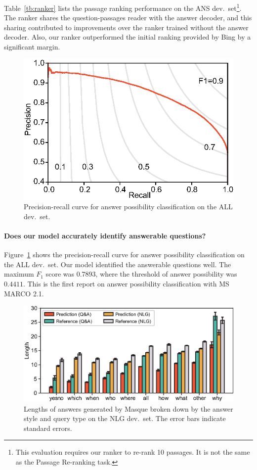 \documentclass[11pt,a4paper]{article}
\theoremstyle{mydef}
\theoremstyle{myprob}
\begin{document}
Table~\ref{tb:ranker} lists the passage ranking performance 
on the ANS dev.~set\footnote{This evaluation requires our ranker to re-rank 10 passages. It is not the same as the Passage Re-ranking task.}.
The ranker shares the 
question-passages 
reader with the answer decoder, and this sharing contributed to improvements over the ranker trained without the answer decoder. 
Also, our ranker outperformed the initial ranking provided by Bing by a significant margin. 


\begin{figure}[t!]
\centering
\includegraphics[width=.36\textwidth]{./images/masque_prcurve333.eps}
\caption{Precision-recall curve for answer possibility classification on the ALL dev.~set.}
\label{fig:anspos}
\end{figure}

\paragraph{Does our model accurately identify answerable questions?}

Figure~\ref{fig:anspos} shows the precision-recall curve for answer possibility classification on the ALL dev.~set.
Our model identified the answerable questions well. The maximum 
$F_1$ score was 0.7893,  where the threshold of answer possibility was $0.4411$.
This is the first report on answer possibility classification with MS MARCO 2.1.

\begin{figure}[t!]
\centering
\includegraphics[width=.47\textwidth]{./images/length3.eps}
\caption{Lengths of answers generated by Masque broken down by the answer style and query type on the NLG dev.\ set. The error bars indicate standard errors.}
\label{fig:length}
\end{figure}
\end{document}
